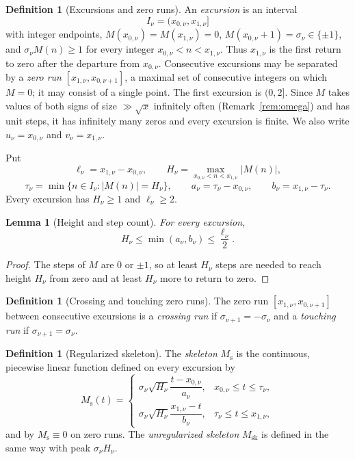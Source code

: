 \documentclass[11pt]{amsart}
\numberwithin{equation}{section}
\theoremstyle{plain}
\newtheorem{lemma}[theorem]{Lemma}
\theoremstyle{definition}
\newtheorem{definition}[theorem]{Definition}
\theoremstyle{remark}
\newcommand{\Ms}{M_{\mathrm{s}}}
\newcommand{\Msk}{M_{\mathrm{sk}}}
\begin{document}
\begin{definition}[Excursions and zero runs]
\label{def:excursion}
An \emph{excursion} is an interval
\[
I_\nu=(x_{0,\nu},x_{1,\nu}]
\]
with integer endpoints, $M(x_{0,\nu})=M(x_{1,\nu})=0$,
$M(x_{0,\nu}+1)=\sigma_\nu\in\{\pm1\}$, and
$\sigma_\nu M(n)\ge1$ for every integer $x_{0,\nu}<n<x_{1,\nu}$. Thus
$x_{1,\nu}$ is the first return to zero after the departure from
$x_{0,\nu}$. Consecutive excursions may be separated by a \emph{zero run}
$[x_{1,\nu},x_{0,\nu+1}]$, a maximal set of consecutive integers on which
$M=0$; it may consist of a single point. The first excursion is $(0,2]$.
Since $M$ takes values of both signs of size $\gg\sqrt x$ infinitely often
(Remark~\ref{rem:omega}) and has unit steps, it has infinitely many zeros
and every excursion is finite. We also write $u_\nu=x_{0,\nu}$ and
$v_\nu=x_{1,\nu}$.

Put
\[
\ell_\nu=x_{1,\nu}-x_{0,\nu},\qquad
H_\nu=\max_{x_{0,\nu}<n<x_{1,\nu}}|M(n)|,
\]
\[
\tau_\nu=\min\{n\in I_\nu:|M(n)|=H_\nu\},\qquad
a_\nu=\tau_\nu-x_{0,\nu},\qquad b_\nu=x_{1,\nu}-\tau_\nu.
\]
Every excursion has $H_\nu\ge1$ and $\ell_\nu\ge2$.
\end{definition}

\begin{lemma}[Height and step count]
\label{lem:height_steps}
For every excursion,
\begin{equation}
\label{eq:height_steps}
H_\nu\le\min(a_\nu,b_\nu)\le\frac{\ell_\nu}{2}.
\end{equation}
\end{lemma}

\begin{proof}
The steps of $M$ are $0$ or $\pm1$, so at least $H_\nu$ steps are needed to
reach height $H_\nu$ from zero and at least $H_\nu$ more to return to zero.
\end{proof}

\begin{definition}[Crossing and touching zero runs]
\label{def:crossing_touching}
The zero run $[x_{1,\nu},x_{0,\nu+1}]$ between consecutive excursions is a
\emph{crossing run} if $\sigma_{\nu+1}=-\sigma_\nu$ and a \emph{touching run}
if $\sigma_{\nu+1}=\sigma_\nu$.
\end{definition}

\begin{definition}[Regularized skeleton]
\label{def:Ms}
The \emph{skeleton} $\Ms$ is the continuous, piecewise linear function
defined on every excursion by
\begin{equation}
\label{eq:Ms_def}
\Ms(t)=
\begin{cases}
\sigma_\nu\sqrt{H_\nu}\dfrac{t-x_{0,\nu}}{a_\nu},
 &x_{0,\nu}\le t\le\tau_\nu,\\[2ex]
\sigma_\nu\sqrt{H_\nu}\dfrac{x_{1,\nu}-t}{b_\nu},
 &\tau_\nu\le t\le x_{1,\nu},
\end{cases}
\end{equation}
and by $\Ms\equiv0$ on zero runs. The \emph{unregularized skeleton} $\Msk$
is defined in the same way with peak $\sigma_\nu H_\nu$.
\end{definition}
\end{document}

